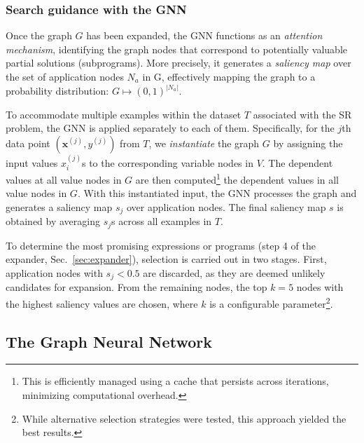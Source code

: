 \subsubsection{Search guidance with the GNN} 

Once the graph $G$ has been expanded, the GNN functions as an \emph{attention mechanism}, identifying the graph nodes that correspond to potentially valuable partial solutions (subprograms). More precisely, it generates a \emph{saliency map} over the set of application nodes 
$N_a$ in G, effectively mapping the graph to a probability distribution: 
$G \mapsto (0,1)^{|N_a|}$. %

To accommodate multiple examples within the dataset 
$T$ associated with the SR problem, the GNN is applied separately to each of them. 
Specifically, for the $j$th data point $(\mathbf{x}^{(j)},y^{(j)})$ from $T$, we \emph{instantiate} the graph $G$ by assigning the input values $x_i^{(j)}$s to the corresponding variable nodes in $V$. The dependent values at all value nodes in $G$ are then computed\footnote{This is efficiently managed using a cache that persists across iterations, minimizing computational overhead.}  the dependent values in all value nodes in $G$.
With this instantiated input, the GNN processes the graph and generates a saliency map $s_j$ over application nodes. The final saliency map $s$ is obtained by averaging $s_j$s across all examples in $T$. 

To determine the most promising expressions or programs (step 4 of the expander, Sec.\ \ref{sec:expander}), selection is carried out in two stages.  First, application nodes with $s_j< 0.5$ are discarded, as they are deemed unlikely candidates for expansion. From the remaining nodes, the top $k=5$ nodes with the highest saliency values are chosen, where $k$ is a configurable parameter\footnote{While alternative selection strategies were tested, this approach yielded the best results.}. 



\subsection{The Graph Neural Network}

